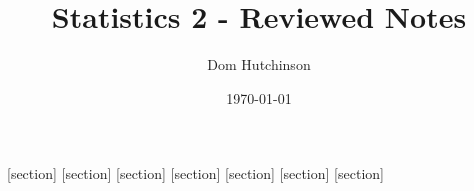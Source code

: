 \documentclass[11pt,a4paper]{article}
\begin{document}
\pagestyle{fancy}
\setlength\parindent{0pt}
\allowdisplaybreaks

\renewcommand{\headrulewidth}{0pt}

\title{Statistics 2 - Reviewed Notes}
\author{Dom Hutchinson}
\date{\today}
\maketitle

\fancyhead[R]{\today}


[section]
[section]
[section]
[section]
[section]
[section]
[section]

\newcommand{\dotprod}[0]{\boldsymbol{\cdot}}
\newcommand{\cosech}[0]{\mathrm{cosech}\ }
\newcommand{\cosec}[0]{\mathrm{cosec}\ }
\newcommand{\sech}[0]{\mathrm{sech}\ }
\newcommand{\prob}[0]{\mathbb{P}}
\newcommand{\nats}[0]{\mathbb{N}}
\newcommand{\cov}[0]{\mathrm{Cov}}
\newcommand{\var}[0]{\mathrm{Var}}
\newcommand{\expect}[0]{\mathbb{E}}
\newcommand{\reals}[0]{\mathbb{R}}
\newcommand{\integers}[0]{\mathbb{Z}}
\newcommand{\indicator}[0]{\mathds{1}}
\newcommand{\nb}[0]{\textit{N.B.} }
\newcommand{\ie}[0]{\textit{i.e.} }
\newcommand{\eg}[0]{\textit{e.g.} }
\newcommand{\X}[0]{\textbf{X}}
\newcommand{\x}[0]{\textbf{x}}
\newcommand{\iid}[0]{\overset{\text{iid}}{\sim}}
\newcommand{\proved}[0]{$\hfill\square$\\}
\end{document}
